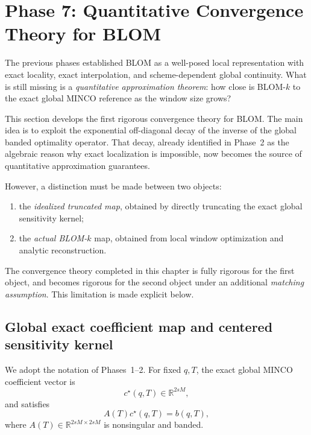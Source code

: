 \section{Phase 7: Quantitative Convergence Theory for BLOM}
\label{sec:phase7_convergence}

The previous phases established BLOM as a well-posed local representation with exact locality, exact interpolation, and scheme-dependent global continuity.
What is still missing is a \emph{quantitative approximation theorem}: how close is BLOM-\(k\) to the exact global MINCO reference as the window size grows?

This section develops the first rigorous convergence theory for BLOM.
The main idea is to exploit the exponential off-diagonal decay of the inverse of the global banded optimality operator.
That decay, already identified in Phase~2 as the algebraic reason why exact localization is impossible, now becomes the source of quantitative approximation guarantees.

However, a distinction must be made between two objects:

\begin{enumerate}
	\item the \emph{idealized truncated map}, obtained by directly truncating the exact global sensitivity kernel;
	\item the \emph{actual BLOM-\(k\)} map, obtained from local window optimization and analytic reconstruction.
\end{enumerate}

The convergence theory completed in this chapter is fully rigorous for the first object, and becomes rigorous for the second object under an additional \emph{matching assumption}.
This limitation is made explicit below.

\subsection{Global exact coefficient map and centered sensitivity kernel}
\label{subsec:phase7_global_kernel}

We adopt the notation of Phases~1--2.
For fixed \(q,T\), the exact global MINCO coefficient vector is
\[
c^\star(q,T)\in\mathbb R^{2sM},
\]
and satisfies
\begin{equation}
	\label{eq:phase7_global_system}
	A(T)c^\star(q,T)=b(q,T),
\end{equation}
where \(A(T)\in\mathbb R^{2sM\times 2sM}\) is nonsingular and banded.


